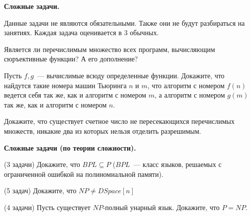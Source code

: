 \setcounter{curtask}{1}

\begin{center}
    \textbf{Сложные задачи.}
\end{center}

Данные задачи не являются обязательными. Также они не будут разбираться на
занятиях. Каждая задача оценивается в $3$ обычных.

\begin{task}
    Является ли перечислимым множество всех программ, вычисляющим
    сюръективные функции? А его дополнение?
\end{task}

\begin{task}
    Пусть $f, g$~--- вычислимые всюду определенные функции. Докажите, что найдутся
	такие номера машин Тьюринга $n$ и $m$, что алгоритм с номером $f(n)$ ведется себя
    так же, как и алгоритм с номером $m$, а алгоритм с номером $g(m)$ так же, как и
    алгоритм с номером $n$.
\end{task}

\begin{task}
    Докажите, что существует счетное число не пересекающихся перечислимых множеств,
    никакие два из которых нельзя отделить разрешимым.
\end{task}


\breakline

\begin{center}
    \textbf{Сложные задачи (по теории сложности).}
\end{center}


\begin{task} (3 задачи)
    Докажите, что $BPL \subseteq P$ ($BPL$~--- класс языков, решаемых с ограниченной
    ошибкой на полиномиальной памяти).
\end{task}

\begin{task} (5 задач)
    Докажите, что $NP \ne DSpace[n]$
\end{task}

\begin{task} (4 задачи)
    Пусть существует $NP$-полный унарный язык. Докажите, что $P = NP$.
\end{task}


